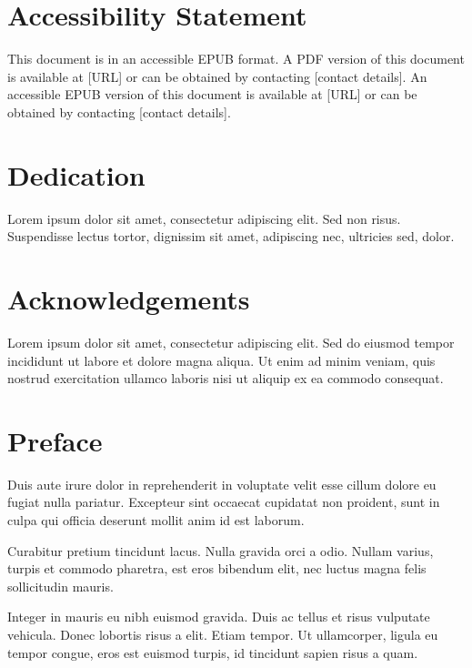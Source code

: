 \documentclass[12pt,reqno,oneside]{amsbook}
\theoremstyle{definition}
\begin{document}
\setcounter{page}{2} %

\chapter*{Accessibility Statement}
\iflatexml
\noindent
This document is in an accessible EPUB format. A PDF version of this document is available at [URL] or can be obtained by contacting [contact details].
\else
\noindent
An accessible EPUB version of this document is available at [URL] or can be obtained by contacting [contact details].
\fi


\chapter*{Dedication}


Lorem ipsum dolor sit amet, consectetur adipiscing elit. Sed non risus. Suspendisse lectus tortor, dignissim sit amet, adipiscing nec, ultricies sed, dolor.

\chapter*{Acknowledgements}

Lorem ipsum dolor sit amet, consectetur adipiscing elit. Sed do eiusmod tempor incididunt ut labore et dolore magna aliqua. Ut enim ad minim veniam, quis nostrud exercitation ullamco laboris nisi ut aliquip ex ea commodo consequat.

\chapter*{Preface}

Duis aute irure dolor in reprehenderit in voluptate velit esse cillum dolore eu fugiat nulla pariatur. Excepteur sint occaecat cupidatat non proident, sunt in culpa qui officia deserunt mollit anim id est laborum.

Curabitur pretium tincidunt lacus. Nulla gravida orci a odio. Nullam varius, turpis et commodo pharetra, est eros bibendum elit, nec luctus magna felis sollicitudin mauris.

Integer in mauris eu nibh euismod gravida. Duis ac tellus et risus vulputate vehicula. Donec lobortis risus a elit. Etiam tempor. Ut ullamcorper, ligula eu tempor congue, eros est euismod turpis, id tincidunt sapien risus a quam.
\end{document}
